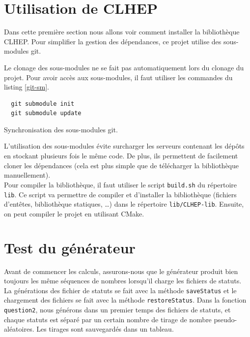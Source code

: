\documentclass[a4paper]{article}
\begin{document}
\clearpage

\section{Utilisation de CLHEP}

Dans cette première section nous allons voir comment installer la bibliothèque
CLHEP. Pour simplifier la gestion des dépendances, ce projet utilise des
sous-modules git.

Le clonage des sous-modules ne se fait pas automatiquement lors du clonage du
projet. Pour avoir accès aux sous-modules, il faut utiliser les commandes
du listing \ref{git-sm}.

\begin{listing}[ht!]
\begin{verbatim}
  git submodule init
  git submodule update
\end{verbatim}
\caption{Synchronisation des sous-modules git.}
\label{git-sm}
\end{listing}

L'utilisation des sous-modules évite surcharger les serveurs contenant les
dépôts en stockant plusieurs fois le même code. De plus, ils permettent de
facilement cloner les dépendances (cela est plus simple que de télécharger la
bibliothèque manuellement).\\

Pour compiler la bibliothèque, il faut utiliser le script \lstinline{build.sh}
du répertoire \lstinline{lib}. Ce script va permettre de compiler et d'installer
la bibliothèque (fichiers d'entêtes, bibliothèque statiques, \dots) dans le
répertoire \lstinline{lib/CLHEP-lib}. Ensuite, on peut compiler le projet en
utilisant CMake.

\section{Test du générateur}

Avant de commencer les calculs, assurons-nous que le générateur produit bien
toujours les même séquences de nombres lorsqu'il charge les fichiers de
statuts.\\

La générations des fichier de statuts se fait avec la méthode
\lstinline{saveStatus} et le chargement des fichiers se fait avec la méthode
\lstinline{restoreStatus}. Dans la fonction \lstinline{question2}, nous générons
dans un premier temps des fichiers de statuts, et chaque statuts est séparé par
un certain nombre de tirage de nombre pseudo-aléatoires. Les tirages sont
sauvegardés dans un tableau.
\end{document}
